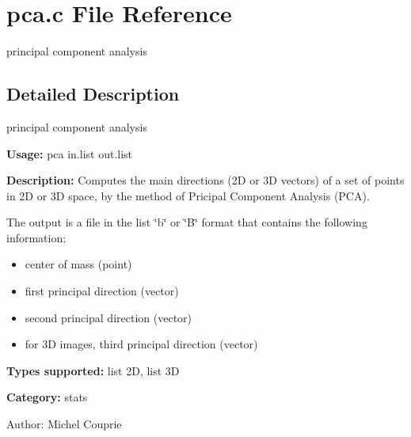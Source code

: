 \section{pca.c File Reference}
\label{pca_8c}
principal component analysis  




\label{_details}
\subsection{Detailed Description}
principal component analysis 

{\bf Usage:} pca in.list out.list

{\bf Description:} Computes the main directions (2D or 3D vectors) of a set of points in 2D or 3D space, by the method of Pricipal Component Analysis (PCA).

The output is a file in the list \char`\"{}b\char`\"{} or \char`\"{}B\char`\"{} format that contains the following information: \begin{itemize}
\item center of mass (point) \item first principal direction (vector) \item second principal direction (vector) \item for 3D images, third principal direction (vector)\end{itemize}
{\bf Types supported:} list 2D, list 3D

{\bf Category:} stats

\begin{Desc}
\item[Author:]Michel Couprie \end{Desc}
